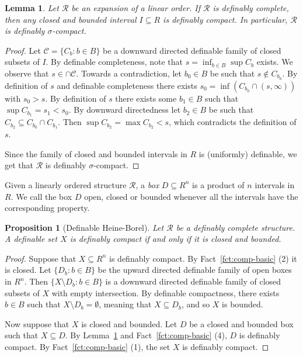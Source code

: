 \documentclass[12pt]{article}
\newcommand{\Cc}{\mathcal{C}}
\newcommand{\Rr}{\mathcal{R}}
\newtheorem{lemma}[theorem]{Lemma}
\newtheorem{proposition}[theorem]{Proposition}
\theoremstyle{definition}
\theoremstyle{remark}
\begin{document}
\begin{lemma}\label{lem:intervals-comp}
Let $\Rr$ be an expansion of a linear order. If $\Rr$ is definably complete, then any closed and bounded interval $I\subseteq R$ is definably compact. In particular, $\Rr$ is definably $\sigma$-compact.
\end{lemma}
\begin{proof}
Let $\Cc=\{C_b : b\in B\}$ be a downward directed definable family of closed subsets of $I$. By definable completeness, note that 
$
s=\inf_{b\in B} \sup C_b
$
exists. We observe that $s\in \cap \Cc$. Towards a contradiction, let $b_0\in B$ be such that $s\notin C_{b_0}$. By definition of $s$ and definable completeness there exists $s_0=\inf (C_{b_0} \cap (s,\infty))$ with $s_0>s$. By definition of $s$ there exists some $b_1\in B$ such that $\sup C_{b_1}=s_1 < s_0$. By downward directedness let $b_2\in B$ be such that $C_{b_2}\subseteq C_{b_0} \cap C_{b_1}$. Then $\sup C_{b_2} = \max C_{b_2} < s$, which contradicts the definition of $s$. 

Since the family of closed and bounded intervals in $R$ is (uniformly) definable, we get that $\Rr$ is definably $\sigma$-compact.  
\end{proof}

Given a linearly ordered structure $\Rr$, a \emph{box} $D\subseteq R^n$ is a product of $n$ intervals in $R$. We call the box $D$ open, closed or bounded whenever all the intervals have the corresponding property. 

\begin{proposition}[Definable Heine-Borel]\label{prop:Heine-Borel}
Let $\Rr$ be a definably complete structure. A definable set $X$ is definably compact if and only if it is closed and bounded.
\end{proposition}
\begin{proof}
Suppose that $X\subseteq R^n$ is definably compact. By Fact~\ref{fct:comp-basic} (2) it is closed. Let $\{ D_b :b\in B\}$ be the upward directed definable family of open boxes in $R^n$. Then $\{ X\setminus D_b : b\in B\}$ is a downward directed definable family of closed subsets of $X$ with empty intersection. By definable compactness, there exists $b\in B$ such that $X\setminus D_b = \emptyset$, meaning that $X\subseteq D_b$, and so $X$ is bounded. 

Now suppose that $X$ is closed and bounded. Let $D$ be a closed and bounded box such that $X\subseteq D$. By Lemma~\ref{lem:intervals-comp} and Fact~\ref{fct:comp-basic} (4), $D$ is definably compact. By Fact~\ref{fct:comp-basic} (1), the set $X$ is definably compact. 
\end{proof}
\end{document}
